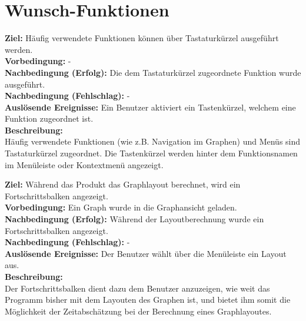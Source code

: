 \label{fa:speichern}

\label{fa:joanatyp}
\section{Wunsch-Funktionen}

\label{fa:hotkey}
\textbf{Ziel:} Häufig verwendete Funktionen können über Tastaturkürzel ausgeführt werden.\\
\textbf{Vorbedingung:} -\\
\textbf{Nachbedingung (Erfolg):} Die dem Tastaturkürzel zugeordnete Funktion wurde ausgeführt.\\
\textbf{Nachbedingung (Fehlschlag):} -\\
\textbf{Auslösende Ereignisse:}
Ein Benutzer aktiviert ein Tastenkürzel, welchem eine Funktion zugeordnet ist.\\
\textbf{Beschreibung:}\\
Häufig verwendete Funktionen (wie z.B. Navigation im Graphen) und Menüs sind Tastaturkürzel zugeordnet.
Die Tastenkürzel werden hinter dem Funktionsnamen im Menüleiste oder Kontextmenü angezeigt.

\label{fa:fortschritt}
\textbf{Ziel:} Während das Produkt das Graphlayout berechnet, wird ein Fortschrittsbalken angezeigt.\\
\textbf{Vorbedingung:} Ein Graph wurde in die Graphansicht geladen.\\
\textbf{Nachbedingung (Erfolg):} Während der Layoutberechnung wurde ein Fortschrittsbalken angezeigt.\\
\textbf{Nachbedingung (Fehlschlag):} -\\
\textbf{Auslösende Ereignisse:} Der Benutzer wählt über die Menüleiste ein Layout aus.\\
\textbf{Beschreibung:}\\
Der Fortschrittsbalken dient dazu dem Benutzer anzuzeigen, wie weit das Programm bisher mit dem Layouten des Graphen ist, und bietet ihm somit die Möglichkeit der Zeitabschätzung bei der Berechnung eines Graphlayoutes.


